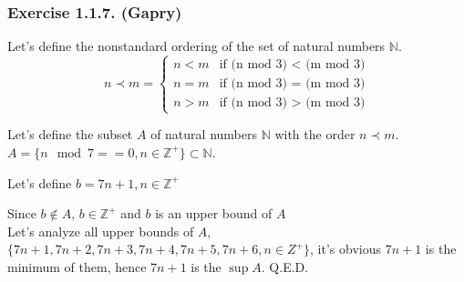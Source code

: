 \subsubsection*{Exercise 1.1.7. (Gapry)}

\begin{flushleft}

Let's define the nonstandard ordering of the set of natural numbers $\mathbb{N}$.
\begin{equation*}
  n \prec m =
    \begin{cases}
      n < m & \text{if (n mod 3) $<$ (m mod 3)} \\
      n = m & \text{if (n mod 3) $=$ (m mod 3)} \\
      n > m & \text{if (n mod 3) $>$ (m mod 3)}
    \end{cases}       
\end{equation*}

Let's define the subset $A$ of natural numbers $\mathbb{N}$ with the order $n \prec m$. \\
$A = \{n \mod 7 == 0, n \in \mathbb{Z^+}\} \subset \mathbb{N}$.
\vspace{10px}

Let's define $b = 7n + 1, n \in \mathbb{Z^+}$
\vspace{10px}

Since $b \notin A$, $b \in \mathbb{Z^+}$ and $b$ is an upper bound of $A$ \\
Let's analyze all upper bounds of $A$,
$\{7n + 1, 7n + 2, 7n + 3, 7n + 4, 7n + 5, 7n + 6, n \in Z^{+} \}$,
it's obvious $7n + 1$ is the minimum of them, hence $7n + 1$ is the $\sup A$. Q.E.D.

\end{flushleft}